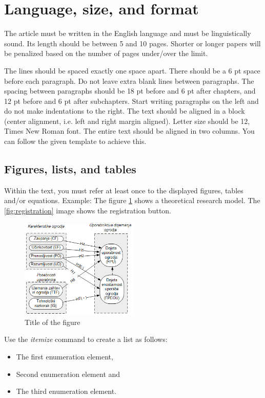 \documentclass{comjnl}
\begin{document}
\section{Language, size, and format} 

The article must be written in the English language and must be linguistically sound. Its length should be between 5 and 10 pages. Shorter or longer papers will be penalized based on the number of pages under/over the limit. 

The lines should be spaced exactly one space apart. There should be a 6 pt space before each paragraph. Do not leave extra blank lines between paragraphs. The spacing between paragraphs should be 18 pt before and 6 pt after chapters, and 12 pt before and 6 pt after subchapters. Start writing paragraphs on the left and do not make indentations to the right. The text should be aligned in a block (center alignment, i.e. left and right margin aligned). Letter size should be 12, Times New Roman font. The entire text should be aligned in two columns. You can follow the given template to achieve this.

\subsection{Figures, lists, and tables}

Within the text, you must refer at least once to the displayed figures, tables and/or equations. Example: The figure \ref{fig:model} shows a theoretical research model. The \ref{fig:registration} image shows the registration button.

\begin{figure}
\centering
\includegraphics[width=0.5\textwidth]{teoreticni_model}
\caption{Title of the figure}\label{fig:model}
\end{figure}

Use the \textit{itemize} command to create a list as follows:

\begin{itemize}
     \item The first enumeration element,
     \item Second enumeration element and
     \item The third enumeration element.
\end{itemize}
\end{document}
